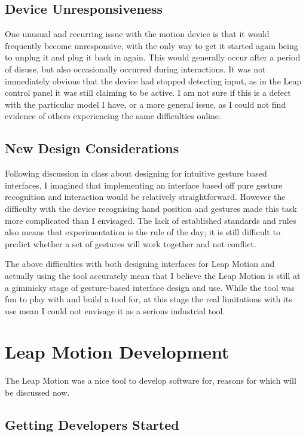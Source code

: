 \documentclass{sigplanconf}
\begin{document}
\subsection{Device Unresponsiveness}

One unusual and recurring issue with the motion device is that it would frequently become unresponsive, with the only way to get it started again being to unplug it and plug it back in again. This would generally occur after a period of disuse, but also occasionally occurred during interactions. It was not immediately obvious that the device had stopped detecting input, as in the Leap control panel it was still claiming to be active. I am not sure if this is a defect with the particular model I have, or a more general issue, as I could not find evidence of others experiencing the same difficulties online.

\subsection{New Design Considerations}

Following discussion in class about designing for intuitive gesture based interfaces, I imagined that implementing an interface based off pure gesture recognition and interaction would be relatively straightforward. However the difficulty with the device recognising hand position and gestures made this task more complicated than I envisaged. The lack of established standards and rules also means that experimentation is the rule of the day; it is still difficult to predict whether a set of gestures will work together and not conflict. 

The above difficulties with both designing interfaces for Leap Motion and actually using the tool accurately mean that I believe the Leap Motion is still at a gimmicky stage of gesture-based interface design and use. While the tool was fun to play with and build a tool for, at this stage the real limitations with its use mean I could not envisage it as a serious industrial tool. 

\section{Leap Motion Development}
\label{sec:leap_development}

The Leap Motion was a nice tool to develop software for, reasons for which will be discussed now.

\subsection{Getting Developers Started}
\end{document}
